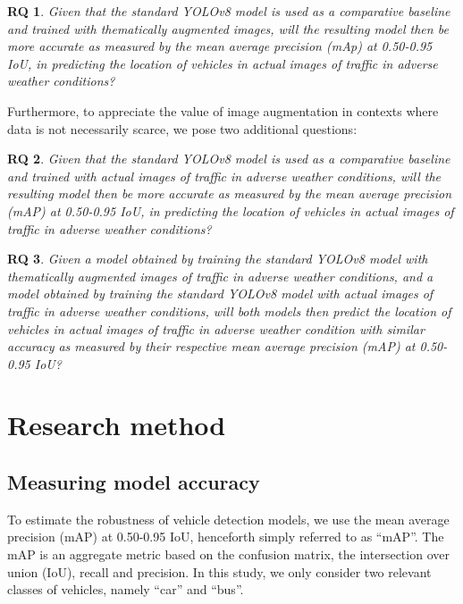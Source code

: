 \documentclass[]{article}
\newtheorem{researchquestion}{RQ}
\begin{document}
	\begin{researchquestion}
		\label{rq1}
		Given that the standard YOLO{\small v8} model is used as a comparative baseline and trained with thematically augmented images, will the resulting model then be more accurate as measured by the mean average precision (mAp) at 0.50-0.95 IoU, in predicting the location of vehicles in actual images of traffic in adverse weather conditions?
	\end{researchquestion}

	Furthermore, to appreciate the value of image augmentation in contexts where data is not necessarily scarce, we pose two additional questions:
	\begin{researchquestion}
		\label{rq2}
		Given that the standard YOLO{\small v8} model is used as a comparative baseline and trained with actual images of traffic in adverse weather conditions, will the resulting model then be more accurate as measured by the mean average precision (mAP) at 0.50-0.95 IoU, in predicting the location of vehicles in actual images of traffic in adverse weather conditions?
	\end{researchquestion}

	\begin{researchquestion}
		\label{rq3}
		Given a model obtained by training the standard YOLO{\small v8} model with thematically augmented images of traffic in adverse weather conditions, and a model obtained by training the standard YOLO{\small v8} model with actual images of traffic in adverse weather conditions, will both models then predict the location of vehicles in actual images of traffic in adverse weather condition with similar accuracy as measured by their respective mean average precision (mAP) at 0.50-0.95 IoU?
	\end{researchquestion}

\section{Research method}
\subsection{Measuring model accuracy}

	To estimate the robustness of vehicle detection models, we use the mean average precision (mAP) at 0.50-0.95 IoU, henceforth simply referred to as ``mAP''. The mAP is an aggregate metric based on the confusion matrix, the intersection over union (IoU), recall and precision. In this study, we only consider two relevant classes of vehicles, namely ``car'' and ``bus''.
\end{document}
